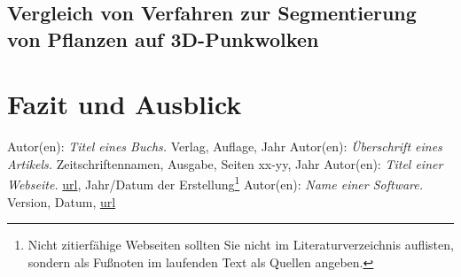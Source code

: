 \documentclass[12pt,titlepage,twoside]{article}
\begin{document}
\subsection{Vergleich von Verfahren zur Segmentierung von Pflanzen auf 3D-Punkwolken}

\newpage
\section{Fazit und Ausblick}
\label{sec:fazit}
%





\newpage
\begin{thebibliography}{99}
\raggedright
{} Autor(en): {\em Titel eines Buchs.}
  Verlag, Auflage, Jahr
 Autor(en): {\em Überschrift eines Artikels.}
  Zeitschriftennamen, Ausgabe, Seiten xx-yy, Jahr
 Autor(en): {\em Titel einer Webseite.}
  \url{url}, Jahr/Datum der Erstellung\footnote{Nicht zitierfähige Webseiten sollten Sie nicht im Literaturverzeichnis auflisten, sondern als Fußnoten im laufenden Text als Quellen angeben.}
 Autor(en): {\em Name einer Software.}
  Version, Datum, \url{url}
\end{thebibliography}
\end{document}
